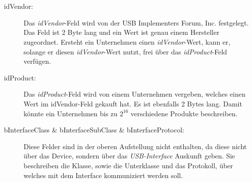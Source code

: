 $ $\\\\\\
\begin{description}
	\item[idVendor: ] Das \textit{idVendor}-Feld wird von der USB Implementers Forum, Inc. festgelegt. Das Feld ist 2 Byte lang und ein Wert ist genau einem Hersteller zugeordnet. Ersteht ein Unternehmen einen \textit{idVendor}-Wert, kann er, solange er diesen \textit{idVendor}-Wert nutzt, frei über das \textit{idProduct}-Feld verfügen.
	
	\item[idProduct: ] Das \textit{idProduct}-Feld wird von einem Unternehmen vergeben, welches einen Wert im idVendor-Feld gekauft hat. Es ist ebenfalls 2 Bytes lang. Damit könnte ein Unternehmen bis zu $2^{16}$ verschiedene Produkte beschreiben.
	
	\item[bInterfaceClass \& bInterfaceSubClass \& bInterfaceProtocol: ] Diese Felder sind in der oberen Aufstellung nicht enthalten, da diese nicht über das Device, sondern über das \textit{USB-Interface} Auskunft geben. Sie beschreiben die Klasse, sowie die Unterklasse und das Protokoll, über welches mit dem Interface kommuniziert werden soll.
	
\end{description}